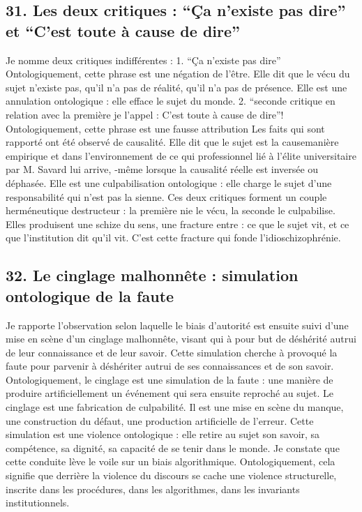 \documentclass[12pt,letterpaper,oneside]{article}
\begin{document}
\subsection*{31. Les deux critiques : “Ça n’existe pas dire” et “C’est toute à cause de dire”}
Je nomme deux critiques indifférentes :
1. “Ça n’existe pas dire”
Ontologiquement, cette phrase est une négation de l’être. Elle dit que le vécu du sujet n’existe pas, qu’il n’a pas de réalité, qu’il n’a pas de présence. Elle est une annulation ontologique : elle efface le sujet du monde.
2. “seconde critique en relation avec la première je l’appel : C’est toute à cause de dire”!
Ontologiquement, cette phrase est une fausse attribution
Les faits qui sont rapporté ont été observé de causalité. Elle dit que le sujet est la causemanière empirique et dans l’environnement de ce qui professionnel lié à l’élite universitaire par M. Savard lui arrive, -même lorsque la causalité réelle est inversée ou déphasée. Elle est une culpabilisation ontologique : elle charge le sujet d’une responsabilité qui n’est pas la sienne.
Ces deux critiques forment un couple herméneutique destructeur : la première nie le vécu, la seconde le culpabilise.
Elles produisent une schize du sens, une fracture entre :
	ce que le sujet vit,
	et ce que l’institution dit qu’il vit.
C’est cette fracture qui fonde l’idioschizophrénie.

\subsection*{32. Le cinglage malhonnête : simulation ontologique de la faute}
Je rapporte l’observation selon laquelle le biais d’autorité est ensuite suivi d’une mise en scène d’un cinglage malhonnête, visant qui à pour but de déshérité autrui de leur connaissance et de leur savoir. Cette simulation cherche à provoqué la faute pour parvenir à déshériter autrui de ses connaissances et de son savoir. Ontologiquement, le cinglage est une simulation de la faute : une manière de produire artificiellement un événement qui sera ensuite reproché au sujet.
Le cinglage est une fabrication de culpabilité. Il est une mise en scène du manque, une construction du défaut, une production artificielle de l’erreur.
Cette simulation est une violence ontologique : elle retire au sujet son savoir, sa compétence, sa dignité, sa capacité de se tenir dans le monde.
Je constate que cette conduite lève le voile sur un biais algorithmique. Ontologiquement, cela signifie que derrière la violence du discours se cache une violence structurelle, inscrite dans les procédures, dans les algorithmes, dans les invariants institutionnels.
\end{document}
